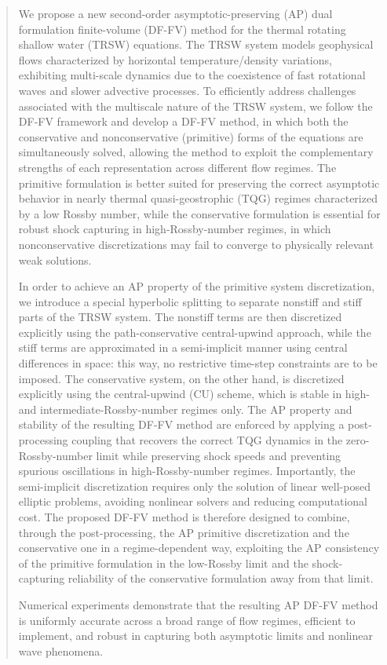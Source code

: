 \documentclass[a4paper,11pt,twoside]{article}
\numberwithin{equation}{section}
\numberwithin{figure}{section}
\numberwithin{table}{section}
\newcommand{\RIIIcolor}[1]{{\leavevmode\color{magenta} #1}}
\begin{document}
\begin{abstract}
We propose a new second-order asymptotic-preserving (AP) dual formulation finite-volume (DF-FV) method for the thermal rotating shallow
water (TRSW) equations. The TRSW system models geophysical flows characterized by horizontal temperature/density variations, exhibiting
multi-scale dynamics due to the coexistence of fast rotational waves and slower advective processes. To efficiently address challenges
associated with the multiscale nature of the TRSW system, we follow the DF-FV framework and develop a DF-FV method, in which both the
conservative and nonconservative (primitive) forms of the equations are simultaneously solved, allowing the method to exploit the
complementary strengths of each representation across different flow regimes. The primitive formulation is better suited for preserving the
correct asymptotic behavior in nearly thermal quasi-geostrophic (TQG) regimes characterized by a low Rossby number, while the conservative
formulation is essential for robust shock capturing in high-Rossby-number regimes, in which nonconservative discretizations may fail to
converge to physically relevant weak solutions.

In order to achieve an AP property of the primitive system discretization, we introduce a special hyperbolic splitting to separate nonstiff
and stiff parts of the TRSW system. The nonstiff terms are then discretized explicitly using the path-conservative central-upwind approach,
while the stiff terms are approximated in a semi-implicit manner using central differences in space: this way, no restrictive time-step
constraints are to be imposed. The conservative system, on the other hand, is discretized explicitly using the central-upwind \RIIIcolor{(CU)} scheme, which
is stable in \RIIIcolor{high- and intermediate}-Rossby-number regimes only. 
The AP property and stability of the resulting DF-FV method are enforced by applying a
post-processing coupling that recovers the correct TQG dynamics in the zero-Rossby-number limit while preserving shock speeds and preventing
spurious oscillations in high-Rossby-number regimes. Importantly, the semi-implicit discretization requires only the solution of linear
well-posed elliptic problems, avoiding nonlinear solvers and reducing computational cost. 
%
\RIIIcolor{The proposed DF-FV method is therefore designed to combine, through the post-processing, the AP primitive discretization and the conservative one in a regime-dependent way, exploiting the AP consistency of the primitive formulation in the low-Rossby limit and the shock-capturing reliability of the conservative formulation away from that limit.}

Numerical experiments demonstrate that the
resulting AP DF-FV method is uniformly accurate across a broad range of flow regimes, efficient to implement, and robust in capturing both
asymptotic limits and nonlinear wave phenomena.
\end{abstract}
\end{document}
